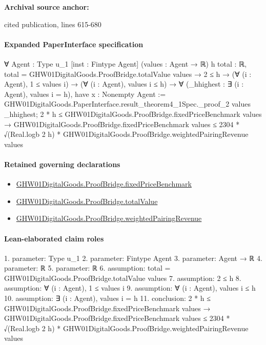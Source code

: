 \documentclass[10pt]{article}
\begin{document}
\textbf{Archival source anchor:} {\footnotesize\raggedright cited publication, lines 615-\allowbreak{}680\par}
\paragraph{Expanded PaperInterface specification}
\begin{ReviewVerbatim}
∀ {Agent : Type u_1} [inst : Fintype Agent] (values : Agent → ℝ) {h total : ℝ},
  total = GHW01DigitalGoods.ProofBridge.totalValue values →
    2 ≤ h →
      (∀ (i : Agent), 1 ≤ values i) →
        (∀ (i : Agent), values i ≤ h) →
          ∀ (_hhighest : ∃ (i : Agent), values i = h),
            have x : Nonempty Agent := GHW01DigitalGoods.PaperInterface.result_theorem4_1Spec._proof_2 values _hhighest;
            2 * h ≤ GHW01DigitalGoods.ProofBridge.fixedPriceBenchmark values →
              GHW01DigitalGoods.ProofBridge.fixedPriceBenchmark values ≤
                2304 * √(Real.logb 2 h) * GHW01DigitalGoods.ProofBridge.weightedPairingRevenue values
\end{ReviewVerbatim}

\paragraph{Retained governing declarations}
\begin{itemize}\raggedright
\item \hyperlink{governing-declaration-999c32dc6e9adaf2}{GHW01\allowbreak{}Digital\allowbreak{}Goods.\allowbreak{}Proof\allowbreak{}Bridge.\allowbreak{}fixed\allowbreak{}Price\allowbreak{}Benchmark}
\item \hyperlink{paper-prerequisite-1dad2de1fe153716}{GHW01\allowbreak{}Digital\allowbreak{}Goods.\allowbreak{}Proof\allowbreak{}Bridge.\allowbreak{}total\allowbreak{}Value}
\item \hyperlink{governing-declaration-e373ea90f301fd9e}{GHW01\allowbreak{}Digital\allowbreak{}Goods.\allowbreak{}Proof\allowbreak{}Bridge.\allowbreak{}weighted\allowbreak{}Pairing\allowbreak{}Revenue}
\end{itemize}
\paragraph{Lean-elaborated claim roles}\begin{ReviewVerbatim}
1. parameter: Type u_1
2. parameter: Fintype Agent
3. parameter: Agent → ℝ
4. parameter: ℝ
5. parameter: ℝ
6. assumption: total = GHW01DigitalGoods.ProofBridge.totalValue values
7. assumption: 2 ≤ h
8. assumption: ∀ (i : Agent), 1 ≤ values i
9. assumption: ∀ (i : Agent), values i ≤ h
10. assumption: ∃ (i : Agent), values i = h
11. conclusion: 2 * h ≤ GHW01DigitalGoods.ProofBridge.fixedPriceBenchmark values →
  GHW01DigitalGoods.ProofBridge.fixedPriceBenchmark values ≤
    2304 * √(Real.logb 2 h) * GHW01DigitalGoods.ProofBridge.weightedPairingRevenue values
\end{ReviewVerbatim}
\end{document}
